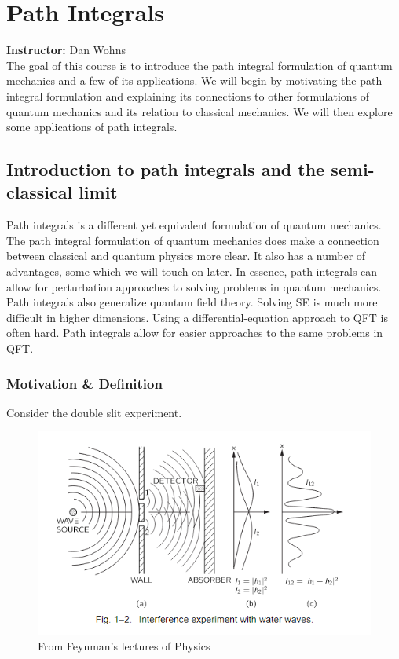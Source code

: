 \documentclass{book}
\theoremstyle{definition}
\begin{document}
\newpage











\chapter{Path Integrals}

\textbf{Instructor:} Dan Wohns\\

The goal of this course is to introduce the path integral formulation of quantum mechanics and a few of its applications. We will begin by motivating the path integral formulation and explaining its connections to other formulations of quantum mechanics and its relation to classical mechanics. We will then explore some applications of path integrals.


\newpage

\section{Introduction to path integrals and the semi-classical limit}

Path integrals is a different yet equivalent formulation of quantum mechanics. The path integral formulation of quantum mechanics does make a connection between classical and quantum physics more clear. It also has a number of advantages, some which we will touch on later. In essence, path integrals can allow for perturbation approaches to solving problems in quantum mechanics. Path integrals also generalize quantum field theory. Solving SE is much more difficult in higher dimensions. Using a differential-equation approach to QFT is often hard. Path integrals allow for easier approaches to the same problems in QFT. \\


\subsection{Motivation \& Definition}

Consider the double slit experiment. 
\begin{figure}[!htb]
	\centering
	\includegraphics[scale=0.8]{double-slit}
	\caption{From Feynman's lectures of Physics}
\end{figure}
\end{document}
